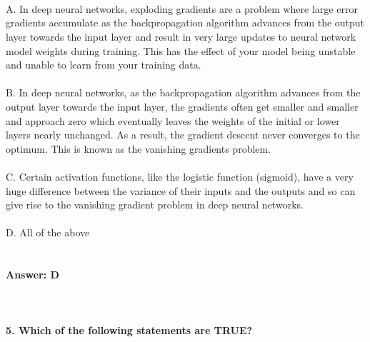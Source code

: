 \documentclass[prl,twocolumn,showpacs,preprintnumbers,superscriptaddress]{revtex4}
\theoremstyle{plain}
\theoremstyle{definition}
\begin{document}
\begin{widetext}
\\
\\
\\
A. In deep neural networks, exploding gradients are a problem where large error gradients accumulate as the backpropagation algorithm advances from the output layer towards the input layer and result in very large updates to neural network model weights during training. This has the effect of your model being unstable and unable to learn from your training data.
\\
\\
B. In deep neural networks, as the backpropagation algorithm advances from the output layer towards the input layer, the gradients often get smaller and smaller and approach zero which eventually leaves the weights of the initial or lower layers nearly unchanged. As a result, the gradient descent never converges to the optimum. This is known as the vanishing gradients problem.
\\
\\
C. Certain activation functions, like the logistic function (sigmoid), have a very huge difference between the variance of their inputs and the outputs and so can give rise to the vanishing gradient problem in deep neural networks.
\\
\\
D. All of the above
\\
\\
\\
\textbf{Answer: D}
\\
\\
\\
\\
\textbf{5. Which of the following statements are TRUE?}
\\

\end{widetext}
\end{document}
